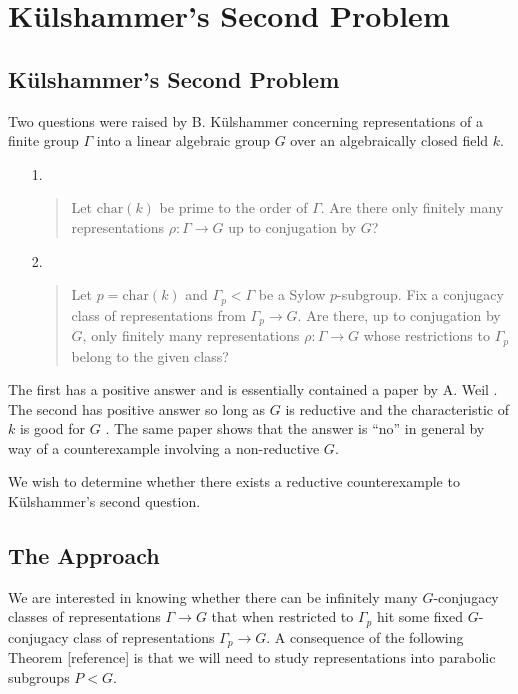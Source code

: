 
\chapter{K\"ulshammer's Second Problem}
\label{Chapter4}

\section{K\"ulshammer's Second Problem}

Two questions were raised by B. K\"ulshammer concerning representations of a finite group $\Gamma$ into a linear algebraic group $G$ over an algebraically closed field $k$. 
\begin{itemize}
  \item[1.] \begin{quote} Let $\mathrm{char}(k)$ be prime to the order of $\Gamma$. Are there only finitely many representations $\rho:\Gamma\rightarrow G$ up to conjugation by $G$?
    \end{quote}
  \item[2.] \begin{quote} Let $p = \mathrm{char}(k)$ and $\Gamma_p < \Gamma$ be a Sylow $p$-subgroup. Fix a conjugacy class of representations from $\Gamma_p\rightarrow G$. Are there, up to conjugation by $G$, only finitely many representations $\rho:\Gamma\rightarrow G$ whose restrictions to $\Gamma_p$ belong to the given class?
    \end{quote}
\end{itemize}

The first has a positive answer and is essentially contained a paper by A. Weil \cite{weil1964remarks}. The second has positive answer so long as $G$ is reductive and the characteristic of $k$ is good for $G$ \cite[Theorem 3]{slodowy1997two}. The same paper shows that the answer is ``no'' in general by way of a counterexample involving a non-reductive $G$.

We wish to determine whether there exists a reductive counterexample to K\"ulshammer's second question.

\section{The Approach}

We are interested in knowing whether there can be infinitely many $G$-conjugacy classes of representations $\Gamma\rightarrow G$ that when restricted to $\Gamma_p$ hit some fixed $G$-conjugacy class of representations $\Gamma_p\rightarrow G$. A consequence of the following Theorem [reference] is that we will need to study representations into parabolic subgroups $P < G$.


